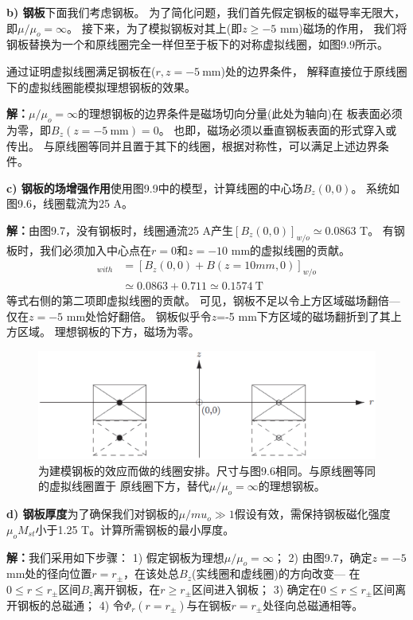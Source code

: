 \textbf{b) 钢板}\qquad 下面我们考虑钢板。
为了简化问题，我们首先假定钢板的磁导率无限大，即$\mu/\mu_o=\infty$。
接下来，为了模拟钢板对其上(即$z\ge -5$ mm)磁场的作用，
我们将钢板替换为一个和原线圈完全一样但至于板下的对称虚拟线圈，如图9.9所示。

通过证明虚拟线圈满足钢板在($r,z=-5\ \mathrm{mm}$)处的边界条件，
解释直接位于原线圈下的虚拟线圈能模拟理想钢板的效果。

\textbf{解：}$\mu/\mu_o=\infty$的理想钢板的边界条件是磁场切向分量(此处为轴向)在
板表面必须为零，即$B_z(z=-5\ \mathrm{mm})=0$。
也即，磁场必须以垂直钢板表面的形式穿入或传出。
与原线圈等同并且置于其下的线圈，根据对称性，可以满足上述边界条件。

\textbf{c) 钢板的场增强作用}\qquad 使用图9.9中的模型，计算线圈的中心场$B_z(0,0)$。
系统如图9.6，线圈载流为25 A。

\textbf{解：}由图9.7，没有钢板时，线圈通流25 A产生$[B_z(0,0)]_{w/o}\simeq 0.0863$ T。
有钢板时，我们必须加入中心点在$r=0$和$z=-10$ mm的虚拟线圈的贡献。
\begin{align*}%
[B_{z}(0,0)]_{with}&=[B_{z}(0,0)+B(z=10mm,0)]_{w/o}\\
&\simeq 0.0863+0.711\simeq 0.1574\ \mathrm{T}
\end{align*}
等式右侧的第二项即虚拟线圈的贡献。
可见，钢板不足以令上方区域磁场翻倍---仅在$z=-5$ mm处恰好翻倍。
钢板似乎令$z$=-5 mm下方区域的磁场翻折到了其上方区域。
理想钢板的下方，磁场为零。

\begin{figure}
	\centering
	\includegraphics[scale=0.6]{chpt9/figs/fig9.9.eps}
	\caption{为建模钢板的效应而做的线圈安排。尺寸与图9.6相同。与原线圈等同的虚拟线圈置于
	原线圈下方，替代$\mu/\mu_o=\infty$的理想钢板。}
\end{figure}

\textbf{d) 钢板厚度}\qquad 为了确保我们对钢板的$\mu/mu_o\gg 1$假设有效，需保持钢板磁化强度$\mu_o M_{st}$小于1.25 T。计算所需钢板的最小厚度。

\textbf{解：}我们采用如下步骤：
1) 假定钢板为理想$\mu/\mu_o=\infty$；
2) 由图9.7，确定$z=-5$ mm处的径向位置$r=r_{\pm}$，在该处总$B_z$(实线圈和虚线圈)的方向改变---
在$0\le r\le r_{\pm}$区间$B_z$离开钢板，在$r\ge r_{\pm}$区间进入钢板；
3) 确定在$0\le r\le r_{\pm}$区间离开钢板的总磁通；
4) 令$\Phi_r(r=r_{\pm})$与在钢板$r=r_{\pm}$处径向总磁通相等。

